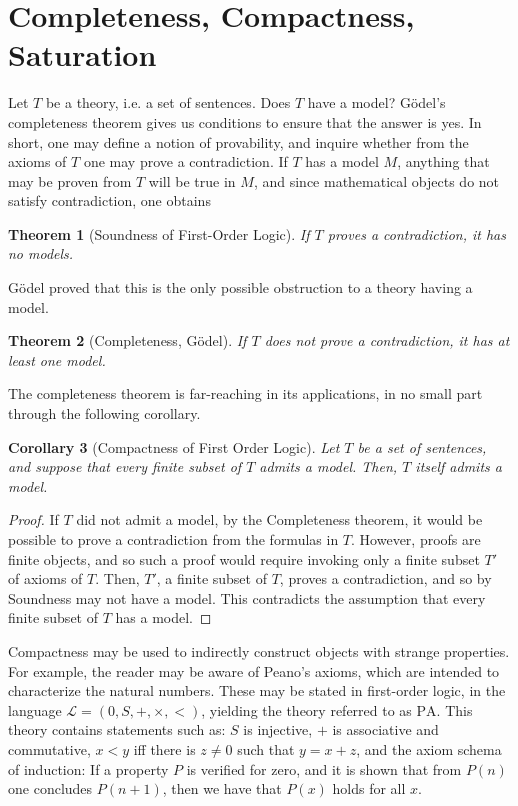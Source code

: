 \documentclass{article}
\newtheorem{theorem}{Theorem}[section]
\newtheorem{corollary}[theorem]{Corollary}
\theoremstyle{nonumberplain}
\newtheorem{proof}{Proof}
\newcommand{\Lang}{\mathcal{L}}
\begin{document}
\section{Completeness, Compactness, Saturation}

Let $T$ be a theory, i.e. a set of sentences. Does $T$ have a model? Gödel's completeness theorem gives us conditions to ensure that the answer is yes. In short, one may define a notion of provability, and inquire whether from the axioms of $T$ one may prove a contradiction. If $T$ has a model $M$, anything that may be proven from $T$ will be true in $M$, and since mathematical objects do not satisfy contradiction, one obtains
\begin{theorem}[Soundness of First-Order Logic]
If $T$ proves a contradiction, it has no models.
\end{theorem}

Gödel proved that this is the only possible obstruction to a theory having a model.
\begin{theorem}[Completeness, Gödel]
If $T$ does not prove a contradiction, it has at least one model.
\end{theorem}

The completeness theorem is far-reaching in its applications, in no small part through the following corollary.
\begin{corollary}[Compactness of First Order Logic]
Let $T$ be a set of sentences, and suppose that every finite subset of $T$ admits a model. Then, $T$ itself admits a model.
\end{corollary}

\begin{proof}
If $T$ did not admit a model, by the Completeness theorem, it would be possible to prove a contradiction from the formulas in $T$. However, proofs are finite objects, and so such a proof would require invoking only a finite subset $T'$ of axioms of $T$. Then, $T'$, a finite subset of $T$, proves a contradiction, and so by Soundness may not have a model. This contradicts the assumption that every finite subset of $T$ has a model.
\end{proof}

Compactness may be used to indirectly construct objects with strange properties. For example, the reader may be aware of Peano's axioms, which are intended to characterize the natural numbers. These may be stated in first-order logic, in the language $\Lang = (0,S,+,\times,<)$, yielding the theory referred to as $\mathrm{PA}$. This theory contains statements such as: $S$ is injective, $+$ is associative and commutative, $x<y$ iff there is $z\neq 0$ such that $y=x+z$, and the axiom schema of induction: If a property $P$ is verified for zero, and it is shown that from $P(n)$ one concludes $P(n+1)$, then we have that $P(x)$ holds for all $x$.
\end{document}
